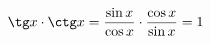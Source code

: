 \documentclass[preview]{standalone}
\begin{document}
\begin{align*}
\tg x \cdot \ctg x = \frac{\sin x}{\cos x} \cdot \frac{\cos x}{\sin x} = 1
\end{align*}
\end{document}
